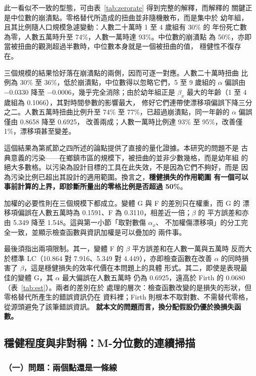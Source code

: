 \documentclass[UTF8, fontset=macnew, a4paper, 12pt]{ctexart}
\newcommand{\cn}[1]{\ding{\number\numexpr171+#1\relax}}
\begin{document}
此一看似不一致的型態，可由表~\ref{tab:zerorate} 得到完整的解釋，而解釋的
關鍵正是中位數的崩潰點。零格替代所造成的扭曲並非隨機散布，而是集中於
幼年組，且其比例隨人口規模急遽變動：人數二十萬時 1 至 4 歲組有 30\% 的
年份死亡數為零，人數五萬時升至 74\%，人數一萬時達 93\%。中位數的崩潰點
為 50\%，亦即當被扭曲的觀測超過半數時，中位數本身就是一個被扭曲的值，
穩健性不復存在。

三個規模的結果恰好落在崩潰點的兩側，因而可逐一對應。人數二十萬時扭曲
比例為 30\% 至 36\%，低於崩潰點，中位數得以忽略它們，5 至 9 歲組的
$\alpha$ 偏誤由 $-0.0330$ 降至 $-0.0006$，幾乎完全消除；由於幼年組正是
$\beta_x$ 最大的年齡（1 至 4 歲組為 0.1066），其對時間參數的影響最大，
修好它們連帶使漂移項偏誤下降三分之二。人數五萬時扭曲比例升至 74\% 至
77\%，已超過崩潰點，同一年齡的 $\alpha$ 偏誤僅由 0.8658 降至 0.6925，
改善兩成；人數一萬時比例達 93\% 至 95\%，改善僅 1\%，漂移項甚至變差。

這個結果為第貳節之四所述的論點提供了直接的量化證據。本研究的問題不是
古典意義的污染——在鄉鎮市區的規模下，被扭曲的並非少數幾格，而是幼年組
的絕大多數格。以污染為設計目標的工具在此失效，不是因為它們不夠好，而是
因為污染比例已超出其設計的適用範圍。換言之，\textbf{穩健損失的作用範圍
有一個可以事前計算的上界，即診斷\cn{2}所量出的零格比例是否超過 50\%}。

加權的必要性則在三個規模下都成立。變體 G 與 F 的差別只在權重，而 G 的
漂移項偏誤在人數五萬時為 0.1591、F 為 0.3110，相差近一倍；$\beta$ 的
平方誤差和亦由 5.349 降至 1.548。這與第一小節「取對數傷 $\alpha_x$、
不加權傷漂移項」的分工完全一致，並顯示檢查函數與資訊加權是可以疊加的
兩件事。

最後須指出兩項限制。其一，變體 F 的 $\beta$ 平方誤差和在人數一萬與五萬時
反而大於標準 LC（10.864 對 7.916、5.349 對 4.449），亦即檢查函數在改善
$\alpha$ 的同時損害了 $\beta$，這是穩健損失的效率代價在本問題上的具體
形式。其二，即使是表現最佳的變體 G，其 $\alpha$ 最大偏誤在人數五萬時
仍為 0.6925，遠高於 Firth 的 0.0680（表~\ref{tab:est}）。兩者的差別在於
處理的層次：檢查函數改變的是損失的形狀，但零格替代所產生的錯誤資訊仍在
資料裡；Firth 則根本不取對數、不需替代零格，從源頭避免了該筆錯誤資訊。
\textbf{就本文的問題而言，換分配假設仍優於換損失函數。}

\subsection{穩健程度與非對稱：M-分位數的連續掃描}\label{sec:mq}

\subsubsection{（一）問題：兩個點還是一條線}
\end{document}
